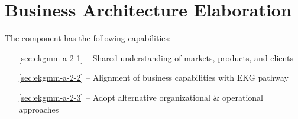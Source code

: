 \chapter{Business Architecture Elaboration}\label{ch:ekgmm-a-2} %

The  component has the following capabilities:

\begin{itemize}[leftmargin=.5in]
  \item [\ref{sec:ekgmm-a-2-1}]  -- Shared understanding of markets, products, and clients
  \item [\ref{sec:ekgmm-a-2-2}]  -- Alignment of business capabilities with EKG pathway
  \item [\ref{sec:ekgmm-a-2-3}]  -- Adopt alternative organizational \& operational approaches
\end{itemize}






